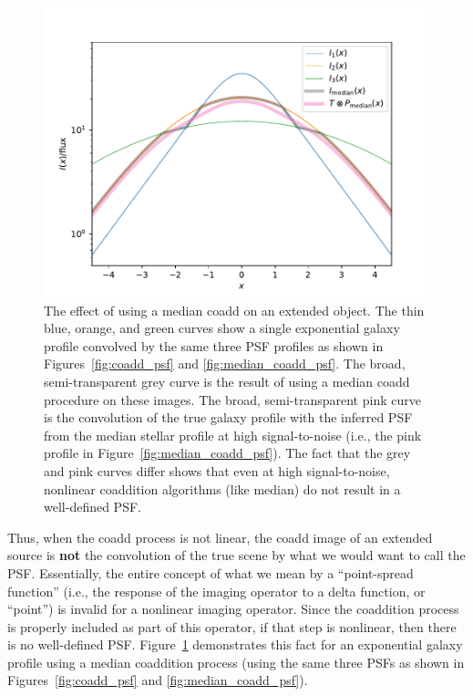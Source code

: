 \documentclass{aastex63}
\newcommand{\irresponse}[1]{{#1}}
\begin{document}
\begin{figure}
\begin{center}
\includegraphics[width=5in]{figures/extended.pdf}
 \caption{The effect of using a median coadd on an extended object. 
 The thin blue, orange, and green curves show a single exponential galaxy profile convolved by the 
 same three PSF profiles as shown in Figures~\ref{fig:coadd_psf} and \ref{fig:median_coadd_psf}. The \irresponse{broad, semi-transparent grey} curve is the result
 of using a median coadd procedure on these images.  The \irresponse{broad, semi-transparent} pink curve is the convolution of the true
 galaxy profile with the inferred PSF from the \irresponse{median} stellar profile at high signal-to-noise (i.e., the pink profile in Figure~\ref{fig:median_coadd_psf}).  The fact that the
 \irresponse{grey} and pink curves differ shows that even at high signal-to-noise, nonlinear coaddition algorithms
 (like median) do not result in a well-defined PSF.} \label{fig:extended}
\end{center}
 \end{figure}

Thus, when the coadd process is not linear,
the coadd image of an extended source is {\bf not} the convolution of the true scene by what
we would want to call the PSF.
Essentially, the entire concept of what we mean by a ``point-spread function'' (i.e., the response
of the imaging operator to a delta function, or ``point'') is invalid for a nonlinear imaging operator.  
Since the coaddition process is properly included as part of this operator, if that
step is nonlinear, then there is no well-defined PSF. 
Figure~\ref{fig:extended} demonstrates this fact for an exponential galaxy profile using a median
coaddition process (using the same three PSFs as shown in Figures~\ref{fig:coadd_psf} and \ref{fig:median_coadd_psf}).
\end{document}
